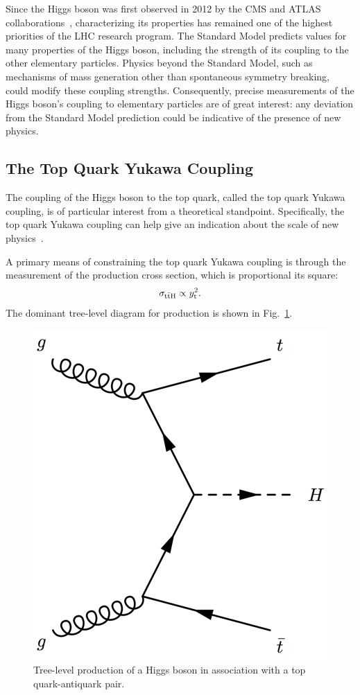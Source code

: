 Since the Higgs boson was first observed in 2012 by the CMS and ATLAS collaborations~\cite{Aad:2012tfa, Chatrchyan:2012xdj, Chatrchyan:2013lba}, characterizing its properties has remained one of the highest priorities of the LHC research program. 
The Standard Model predicts values for many properties of the Higgs boson, including the strength of its coupling to the other elementary particles.
Physics beyond the Standard Model, such as mechanisms of mass generation other than spontaneous symmetry breaking, could modify these coupling strengths. 
Consequently, precise measurements of the Higgs boson's coupling to elementary particles are of great interest: any deviation from the Standard Model prediction could be indicative of the presence of new physics.
%
\subsection{The Top Quark Yukawa Coupling}
The coupling of the Higgs boson to the top quark, called the top quark Yukawa coupling, is of particular interest from a theoretical standpoint.
Specifically, the top quark Yukawa coupling can help give an indication about the scale of new physics~\cite{why_care_top_yukawa}.

A primary means of constraining the top quark Yukawa coupling is through the measurement of the \ttH production cross section, which is proportional its square:
\begin{equation}
\sigma_{\mathrm{t\bar{t}H}} \propto y_{\text{t}}^2.
\end{equation}
The dominant tree-level diagram for \ttH production is shown in Fig.~\ref{fig:tth_feynman}.
\begin{figure} [htbp!]
    \centering
    \includegraphics[width=0.4\linewidth]{figures/tth/tth_feynman.png}
    \caption{Tree-level production of a Higgs boson in association with a top quark-antiquark pair.}
    \label{fig:tth_feynman}
\end{figure} 

